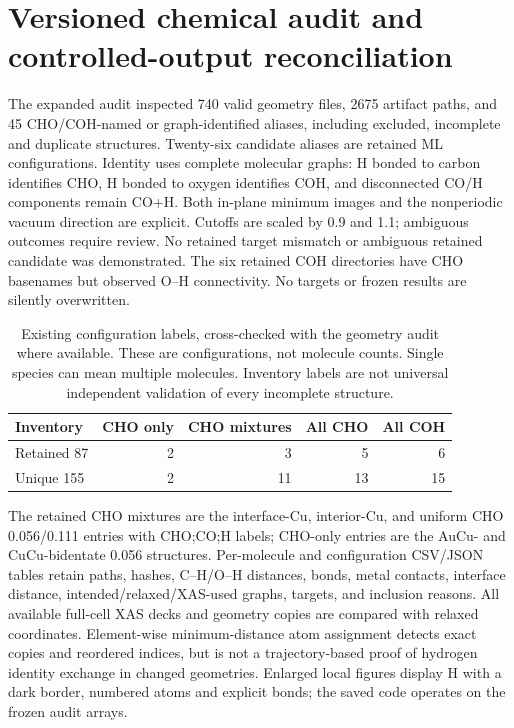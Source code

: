 \clearpage
\section{Versioned chemical audit and controlled-output reconciliation}
The expanded audit inspected 740 valid geometry files, 2675 artifact paths, and 45 CHO/COH-named or graph-identified aliases, including excluded, incomplete and duplicate structures. Twenty-six candidate aliases are retained ML configurations. Identity uses complete molecular graphs: H bonded to carbon identifies CHO, H bonded to oxygen identifies COH, and disconnected CO/H components remain CO+H. Both in-plane minimum images and the nonperiodic vacuum direction are explicit. Cutoffs are scaled by 0.9 and 1.1; ambiguous outcomes require review. No retained target mismatch or ambiguous retained candidate was demonstrated. The six retained COH directories have CHO basenames but observed O--H connectivity. No targets or frozen results are silently overwritten.

\begin{table}[htbp]\centering\begin{tabular}{lrrrr}\toprule Inventory & CHO only & CHO mixtures & All CHO & All COH\\\midrule Retained 87 &2&3&5&6\\ Unique 155 &2&11&13&15\\\bottomrule\end{tabular}\caption{Existing configuration labels, cross-checked with the geometry audit where available. These are configurations, not molecule counts. Single species can mean multiple molecules. Inventory labels are not universal independent validation of every incomplete structure.}\end{table}

The retained CHO mixtures are the interface-Cu, interior-Cu, and uniform CHO 0.056/0.111 entries with CHO;CO;H labels; CHO-only entries are the AuCu- and CuCu-bidentate 0.056 structures. Per-molecule and configuration CSV/JSON tables retain paths, hashes, C--H/O--H distances, bonds, metal contacts, interface distance, intended/relaxed/XAS-used graphs, targets, and inclusion reasons. All available full-cell XAS decks and geometry copies are compared with relaxed coordinates. Element-wise minimum-distance atom assignment detects exact copies and reordered indices, but is not a trajectory-based proof of hydrogen identity exchange in changed geometries. Enlarged local figures display H with a dark border, numbered atoms and explicit bonds; the saved code operates on the frozen audit arrays.

